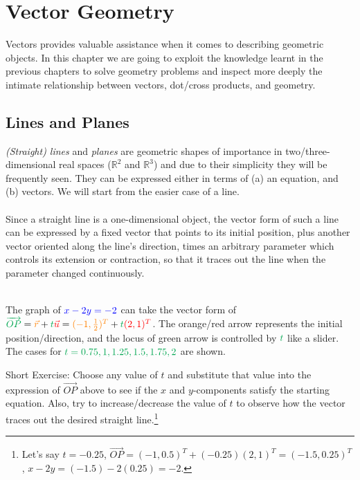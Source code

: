 \chapter{Vector Geometry}

Vectors provides valuable assistance when it comes to describing geometric objects. In this chapter we are going to exploit the knowledge learnt in the previous chapters to solve geometry problems and inspect more deeply the intimate relationship between vectors, dot/cross products, and geometry.

\section{Lines and Planes}
\textit{(Straight) lines} and \textit{planes} are geometric shapes of importance in two/three-dimensional real spaces ($\mathbb{R}^2$ and $\mathbb{R}^3$) and due to their simplicity they will be frequently seen. They can be expressed either in terms of (a) an equation, and (b) vectors. We will start from the easier case of a line.\\
\\
Since a straight line is a one-dimensional object, the vector form of such a line can be expressed by a fixed vector that points to its initial position, plus another vector oriented along the line's direction, times an arbitrary parameter which controls its extension or contraction, so that it traces out the line when the parameter changed continuously.
\begin{center}
\\
The graph of $\color{blue}x - 2y = -2$ can take the vector form of ${\color{Green}\overrightarrow{OP}} = {\color{orange}\vec{r}} + {\color{Green}t} {\color{red}\vec{u}} = {\color{orange}(-1,\frac{1}{2})^T} + {\color{Green}t}{\color{red}(2,1)^T}$. The orange/red arrow represents the initial position/direction, and the locus of green arrow is controlled by $\color{Green}t$ like a slider. The cases for $\color{Green}t = 0.75, 1, 1.25, 1.5, 1.75, 2$ are shown.
\end{center}
Short Exercise: Choose any value of $t$ and substitute that value into the expression of $\overrightarrow{OP}$ above to see if the $x$ and $y$-components satisfy the starting equation. Also, try to increase/decrease the value of $t$ to observe how the vector traces out the desired straight line.\footnote{Let's say $t = -0.25$, $\overrightarrow{OP}=(-1,0.5)^T + (-0.25)(2,1)^T = (-1.5, 0.25)^T$, $x - 2y = (-1.5) - 2(0.25) = -2$.}


